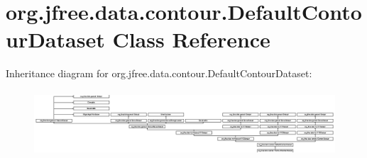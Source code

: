 \hypertarget{classorg_1_1jfree_1_1data_1_1contour_1_1_default_contour_dataset}{}\section{org.\+jfree.\+data.\+contour.\+Default\+Contour\+Dataset Class Reference}
\label{classorg_1_1jfree_1_1data_1_1contour_1_1_default_contour_dataset}
Inheritance diagram for org.\+jfree.\+data.\+contour.\+Default\+Contour\+Dataset\+:\begin{figure}[H]
\begin{center}
\leavevmode
\includegraphics[height=2.482269cm]{classorg_1_1jfree_1_1data_1_1contour_1_1_default_contour_dataset}
\end{center}
\end{figure}
